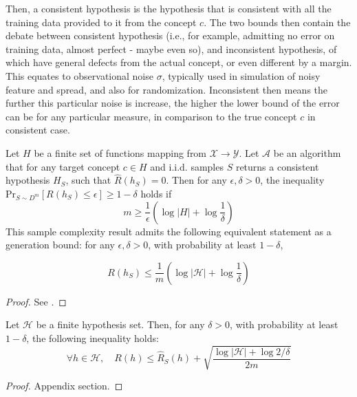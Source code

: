 \documentclass[twoside,10pt]{article}
\begin{document}
Then, a consistent hypothesis is the hypothesis that is consistent with all the training data provided to it from the concept $c$. The two bounds then contain the debate between consistent hypothesis (i.e., for example, admitting no error on training data, almost perfect - maybe even so), and inconsistent hypothesis, of which have general defects from the actual concept, or even different by a margin. This equates to observational noise $\sigma$, typically used in simulation of noisy feature and spread, and also for randomization. Inconsistent then means the further this particular noise is increase, the higher the lower bound of the error can be for any particular measure, in comparison to the true concept $c$ in consistent case. 

\begin{theorem}
    Let $H$ be a finite set of functions mapping from $\mathcal{X}\to \mathcal{Y}$. Let $\mathcal{A}$ be an algorithm that for any target concept $c\in H$ and i.i.d. samples $S$ returns a consistent hypothesis $H_{S}$, such that $\hat{R}(h_{S}) = 0$. Then for any  $\epsilon,\delta>0$, the inequality $\mathrm{Pr}_{S\sim D^{m}}[R(h_{S})\leq \epsilon]\geq 1-\delta$ holds if $$m\geq \frac{1}{\epsilon}\left( \log{\lvert H \rvert }+\log{\frac{1}{\delta}} \right)$$
This sample complexity result admits the following equivalent statement as a generation bound: for any $\epsilon,\delta>0$, with probability at least $1-\delta$, 

\begin{equation}
    R(h_S) \leq \frac{1}{m} \left( \log{|\mathcal{H}|} + \log{\frac{1}{\delta}} \right)
\end{equation}
\end{theorem}
\begin{proof}
    See \cite{10.5555/2371238}.
\end{proof}

\begin{theorem}\label{thm:theorem_inconsistent}
    Let $\mathcal{H}$ be a finite hypothesis set. Then, for any $\delta > 0$, with probability at least $1-\delta$, the following inequality holds: 
    \begin{equation}
        \forall h \in \mathcal{H}, \quad R(h) \leq \hat{R}_S (h) + \sqrt{\frac{\log{|\mathcal{H}|}+ \log{2/\delta}}{2m}}
    \end{equation}
\end{theorem}
\begin{proof}
    Appendix section.
\end{proof}
\end{document}

